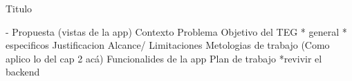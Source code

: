 Titulo 



- Propuesta (vistas de la app)
    Contexto 
    Problema
    Objetivo del TEG
    * general
    * especificos
    Justificacion
    Alcance/ Limitaciones
    Metologias de trabajo (Como aplico lo del cap 2 acá)
    Funcionalides de la app
    Plan de trabajo
        *revivir el backend



